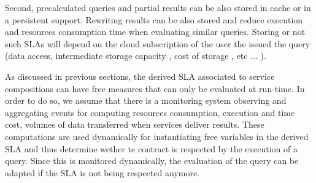 Second, precalculated queries and partial results can be also stored in cache or in a persistent support. Rewriting results can be also stored and reduce execution and resources consumption time when evaluating similar queries. Storing or not such SLAs will depend on the cloud subscription of the user the issued the query (data access, intermediate storage capacity , cost of storage , etc ... ).

As discussed in previous sections, the derived SLA associated to service compositions can have free measures that can only be evaluated at run-time. In order to do so, we assume that there is a monitoring system observing and aggregating events for computing resources consumption, execution and time cost, volumes of data transferred when services deliver results. These computations are used dynamically for instantiating free variables in the derived SLA and thus determine wether te contract is respected by the execution of a query. Since this is monitored dynamically, the evaluation of the query can be adapted if the SLA is not being respected anymore.

